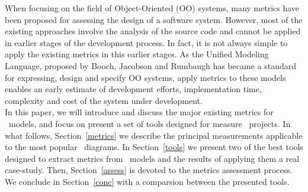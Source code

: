 When focusing on the field of Object-Oriented (OO) systems, many metrics have been proposed for assessing the design of a software system.
However, most of the existing approaches involve the analysis of the source code and cannot be applied in earlier stages of the development process.
In fact, it is not always simple to apply the existing metrics in this earlier stages. 
As the \textsf{Unified Modeling Language}, proposed by Booch, Jacobson and Rumbaugh\cite{USDPuml} has became a standard for expressing, design and specify OO systems, apply metrics to these models enables an early estimate of development efforts, implementation time, complexity and cost of the system under development. \\

In this paper, we will introduce and discuss the major existing metrics for \umlS~models, and focus on present a set of tools designed for measure \umlS~projects.
In what follows, Section~\ref{metrics} we describe the principal measurements applicable to the most popular \umlS~diagrams.
In Section~\ref{tools} we present two of the best tools designed to extract metrics from \umlS~models and the results of applying them a real case-study.
Then, Section~\ref{assess} is devoted to the metrics assessment process.
We conclude in Section~\ref{conc} with a comparsion between the presented tools.

